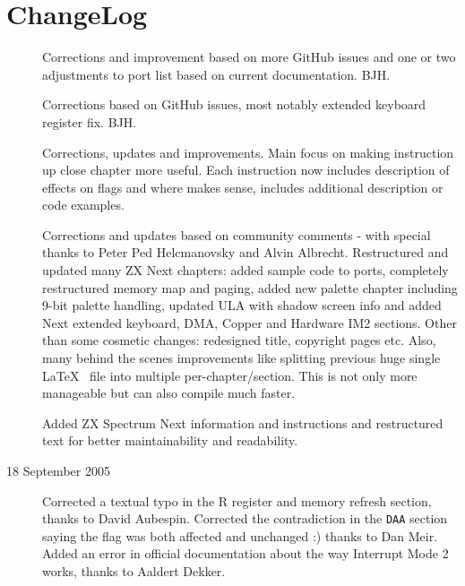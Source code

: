 \pagebreak
\section{ChangeLog}

\begin{description}


	\item[\LatestRevisionName]
	Corrections and improvement based on more GitHub issues and one or two adjustments to port list based on current documentation. BJH.

	\item[\RevisionFourName]
	Corrections based on GitHub issues, most notably extended keyboard register fix. BJH.

	\item[\RevisionThreeName]
	Corrections, updates and improvements. Main focus on making instruction up close chapter more useful. Each instruction now includes description of effects on flags and where makes sense, includes additional description or code examples.

	\item[\RevisionTwoName]
	Corrections and updates based on community comments - with special thanks to Peter Ped Helcmanovsky and Alvin Albrecht. Restructured and updated many ZX Next chapters: added sample code to ports, completely restructured memory map and paging, added new palette chapter including 9-bit palette handling, updated ULA with shadow screen info and added Next extended keyboard, DMA, Copper and Hardware IM2 sections. Other than some cosmetic changes: redesigned title, copyright pages etc. Also, many behind the scenes improvements like splitting previous huge single \LaTeX~ file into multiple per-chapter/section. This is not only more manageable but can also compile much faster.

	\item[\RevisionOneName]
	Added ZX Spectrum Next information and instructions and restructured text for better maintainability and readability.

	\item[18 September 2005]
	Corrected a textual typo in the R register and memory refresh section, thanks to David Aubespin. Corrected the contradiction in the {\tt DAA} section saying the \FlagNF{} flag was both affected and unchanged :) thanks to Dan Meir. Added an error in official documentation about the way Interrupt Mode 2 works, thanks to Aaldert Dekker.
	

\end{description}
